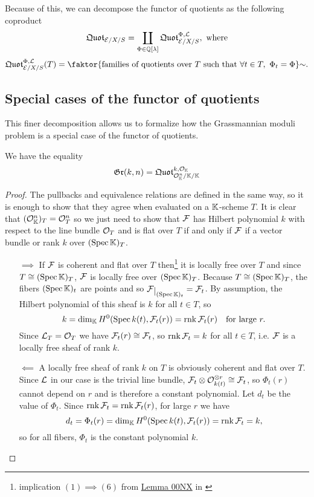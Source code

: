 Because of this, we can decompose the functor of quotients as the following coproduct
\[\mathfrak{Quot}_{\mathcal{E}/X/S}=\coprod_{\Phi\in\mathbb{Q}[\lambda]}\mathfrak{Quot}^{\Phi,\mathcal{L}}_{\mathcal{E}/X/S},\text{ where}\]
\[\quotf^{\Phi,\Lc}_{\Ec/X/S}(T)=\quot{\cpa{\text{families of quotients over $T$ such that $\forall t\in T,\ \Phi_t=\Phi$}}}\sim.\]

\subsection{Special cases of the functor of quotients}
This finer decomposition allows us to formalize how the Grassmannian moduli problem is a special case of the functor of quotients.
\begin{proposition}
We have the equality
\[\mathfrak{Gr}(k,n)=\mathfrak{Quot}^{k,\mathcal{O}_{\mathbb{K}}}_{\mathcal{O}_{\mathbb{K}}^n/\mathbb{K}/\mathbb{K}}\]
\end{proposition}
\begin{proof}
The pullbacks and equivalence relations are defined in the same way, so it is enough to show that they agree when evaluated on a $\mathbb{K}$-scheme $T$. It is clear that $(\mathcal{O}_{\mathbb{K}}^n)_T=\mathcal{O}_T^n$ so we just need to show that $\mathcal{F}$ has Hilbert polynomial $k$ with respect to the line bundle $\mathcal{O}_T$ and is flat over $T$ if and only if $\mathcal{F}$ if a vector bundle or rank $k$ over $(\mathrm{Spec}\, \mathbb{K})_T$. 
\setlength{\leftmargini}{1.2cm}
\begin{itemize}
\item[$\boxed{\implies}$] If $\mathcal{F}$ is coherent and flat over $T$ then\footnote{implication $(1)\implies (6)$ from \href{https://stacks.math.columbia.edu/tag/00NX}{Lemma 00NX} in \cite{stacks}} it is locally free over $T$ and since $T\cong(\mathrm{Spec}\,\mathbb{K})_T$, $\mathcal{F}$ is locally free over $(\mathrm{Spec}\,\mathbb{K})_T$. Because $T\cong(\mathrm{Spec}\,\mathbb{K})_T$, the fibers $(\mathrm{Spec}\,\mathbb{K})_t$ are points and so $\Fc\res{(\Spec \K)_t}=\Fc_t$. By assumption, the Hilbert polynomial of this sheaf is $k$ for all $t\in T$, so 
\[k=\dim_{\mathbb{K}} H^0(\mathrm{Spec}\, k(t),\mathcal{F}_t(r))=\mathrm{rnk}\, \mathcal{F}_t(r)\quad \text{for large }r.\]
Since $\mathcal{L}_T=\mathcal{O}_T$ we have $\mathcal{F}_t(r)\cong \mathcal{F}_t$, so $\mathrm{rnk}\, \mathcal{F}_t=k$ for all $t\in T$, i.e. $\mathcal{F}$ is a locally free sheaf of rank $k$.
\item[$\boxed{\impliedby}$] A locally free sheaf of rank $k$ on $T$ is obviously coherent and flat over $T$. Since $\mathcal{L}$ in our case is the trivial line bundle, $\mathcal{F}_t\otimes \mathcal{O}_{k(t)}^{\otimes r}\cong \mathcal{F}_t$, so $\Phi_t(r)$ cannot depend on $r$ and is therefore a constant polynomial. Let $d_t$ be the value of $\Phi_t$. Since $\mathrm{rnk}\, \mathcal{F}_t=\mathrm{rnk}\, \mathcal{F}_t(r)$, for large $r$ we have 
\[d_t=\Phi_t(r)=\dim_{\mathbb{K}} H^0(\mathrm{Spec}\, k(t), \mathcal{F}_t(r))=\mathrm{rnk}\,\mathcal{F}_t=k,\]
so for all fibers, $\Phi_t$ is the constant polynomial $k$.
\end{itemize}
\setlength{\leftmargini}{0.5cm}
\end{proof}

